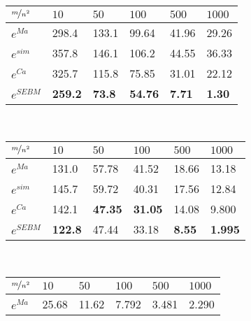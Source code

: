 



\begin{table*}[]
    \centering 
    \begin{minipage}[]{0.8\textwidth}
        \centering
        \caption{Airport Game Average Errors}\label{tab1}
			\begin{tabular}{llllll}
			\hline
			$\nicefrac{m}{n^2}$ & $10$ & $50$ & $100$ & $500$ & $1000$ \\
			\hline
			$e^{Ma}$   & 298.4 & 133.1 & 99.64 & 41.96 & 29.26 \\
			$e^{sim}$  & 357.8 & 146.1 & 106.2 & 44.55 & 36.33 \\
			$e^{Ca}$   & 325.7 & 115.8 & 75.85 & 31.01 & 22.12 \\
			$e^{SEBM}$ & \textbf{259.2} & \textbf{73.8} & \textbf{54.76} & \textbf{7.71} & \textbf{1.30}  \\
			\hline
			\end{tabular}
    \end{minipage}
	\\\vspace{4mm}
    \begin{minipage}[]{0.8\textwidth}
        \centering
        \caption{Voting Game Average Errors}\label{tab2}
			\begin{tabular}{llllll}
			\hline
			$\nicefrac{m}{n^2}$ & $10$ & $50$ & $100$ & $500$ & $1000$ \\
			\hline
			$e^{Ma}$    & 131.0 & 57.78 & 41.52 & 18.66 & 13.18 \\
			$e^{sim}$   & 145.7 & 59.72 & 40.31 & 17.56 & 12.84 \\
			$e^{Ca}$    & 142.1 & \textbf{47.35} & \textbf{31.05} & 14.08 & 9.800 \\
			$e^{SEBM}$  & \textbf{122.8} & 47.44 & 33.18 & \textbf{8.55} & \textbf{1.995}  \\
			\hline
			\end{tabular}
    \end{minipage}
	\\\vspace{4mm}
    \begin{minipage}[]{0.8\textwidth}
        \centering
        \caption{Simple Reward Division Game average errors}\label{tab3}
			\begin{tabular}{llllll}
			\hline
			$\nicefrac{m}{n^2}$ & $10$ & $50$ & $100$ & $500$ & $1000$ \\
			\hline
			$e^{Ma}$    & 25.68 & 11.62 & 7.792 & 3.481 & 2.290 \\

\end{tabular}
\end{minipage}
\end{table*}
